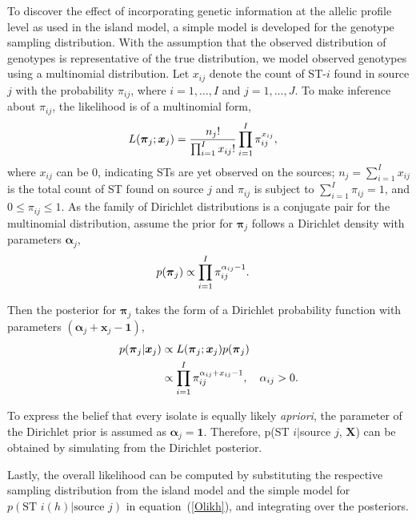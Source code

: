 \documentclass[times, doublespace]{WileyNJD-v2}%
\begin{document}
To discover the effect of incorporating genetic information at the allelic profile level as used in the island model, a simple model is developed for the genotype sampling distribution. With the assumption that the observed distribution of genotypes is representative of the true distribution, we model observed genotypes using a multinomial distribution. Let $x_{ij}$ denote the count of ST-$i$ found in source $j$ with the probability $\pi_{ij}$, where $i=1, \ldots, I$ and $j=1, \ldots, J$. To make inference about $\pi_{ij}$, the likelihood is of a multinomial form,
\begin{align}
        L(\boldsymbol{\pi}_{j} ; \boldsymbol{x}_{j}) & = \frac{n_j!}{\prod_{i=1}^{I} x_{ij}!} \prod_{i=1}^I \pi_{ij}^{x_{ij}}, \notag
\end{align}
where $x_{ij}$ can be $0$, indicating STs are yet observed on the sources; $n_j=\sum_{i=1}^I x_{ij}$ is the total count of ST found on source $j$ and $\pi_{ij}$ is subject to $\sum_{i=1}^I \pi_{ij} =1$, and $0 \leq \pi_{ij} \leq 1$. As the family of Dirichlet distributions is a conjugate pair for the multinomial distribution, assume the prior for $\boldsymbol{\pi}_{j}$ follows a Dirichlet density with parameters $\boldsymbol{\alpha}_{j}$,
\begin{align}
  p(\boldsymbol{\pi}_{j}) & \propto \prod_{i=1}^{I}\pi_{ij}^{\alpha_{ij}-1}. \notag
\end{align}

Then the posterior for $\boldsymbol{\pi}_{j}$ takes the form of a Dirichlet probability function with parameters $(\boldsymbol{\alpha}_{j}+\boldsymbol{x}_{j}-\boldsymbol{1})$,
\begin{align}
        p(\boldsymbol{\pi}_{j} \vert \boldsymbol{x}_{j} ) & \propto L(\boldsymbol{\pi}_{j} ; \boldsymbol{x}_{j}) p(\boldsymbol{\pi}_{j}) \notag \\ 
       & \propto \prod_{i=1}^{I}\pi_{ij}^{\alpha_{ij} + x_{ij}-1}, \quad \alpha_{ij} >0. \notag
 \end{align}

To express the belief that every isolate is equally likely \emph{apriori}, the parameter of the Dirichlet prior is assumed as $\boldsymbol{\alpha}_{j}=\boldsymbol{1}$. Therefore, p(ST $i\vert$source $j$, $\boldsymbol{X}$) can be obtained by simulating from the Dirichlet posterior.

Lastly, the overall likelihood can be computed by substituting the respective sampling distribution from the island model and the simple model for $p(\text{ST }i(h)\vert\text{source }j)$ in equation~(\ref{Olikh}), and integrating over the posteriors.
\end{document}
